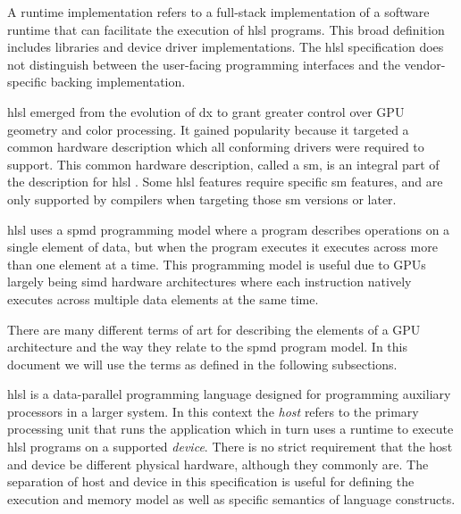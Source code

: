 \p A runtime implementation
refers to a full-stack implementation of a software runtime that can facilitate
the execution of \acrshort{hlsl} programs. This broad definition includes
libraries and device driver implementations. The \acrshort{hlsl} specification
does not distinguish between the user-facing programming interfaces and the
vendor-specific backing implementation.


\p \acrshort{hlsl} emerged from the evolution of \gls{dx} to grant greater
control over GPU geometry and color processing. It gained popularity because it
targeted a common hardware description which all conforming drivers were
required to support. This common hardware description, called a \gls{sm}, is an
integral part of the description for \acrshort{hlsl} . Some \acrshort{hlsl}
features require specific \gls{sm} features, and are only supported by compilers
when targeting those \gls{sm} versions or later.


\p \acrshort{hlsl} uses a \acrfull{spmd} programming model where a program
describes operations on a single element of data, but when the program executes
it executes across more than one element at a time. This programming model is
useful due to GPUs largely being \acrfull{simd} hardware architectures where
each instruction natively executes across multiple data elements at the same
time.

\p There are many different terms of art for describing the elements of a GPU
architecture and the way they relate to the \acrshort{spmd} program model. In
this document we will use the terms as defined in the following subsections.



\p \acrshort{hlsl} is a data-parallel programming language designed for
programming auxiliary processors in a larger system. In this context the
\textit{host} refers to the primary processing unit that runs the application
which in turn uses a runtime to execute \acrshort{hlsl} programs on a supported
\textit{device}. There is no strict requirement that the host and device be
different physical hardware, although they commonly are. The separation of host
and device in this specification is useful for defining the execution and memory
model as well as specific semantics of language constructs.

